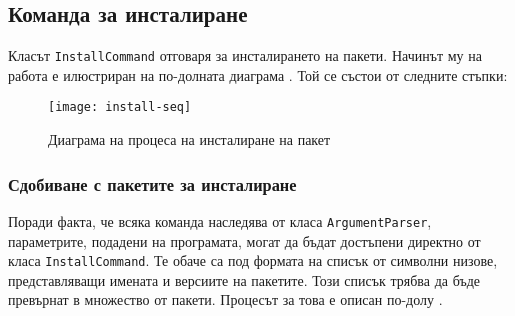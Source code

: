 \subsection{Команда за инсталиране}

Класът \texttt{InstallCommand} отговаря за инсталирането на пакети. Начинът му
на работа е илюстриран на по-долната диаграма . Той се
състои от следните стъпки:

\begin{figure}[H]
    \centering
    \texttt{[image: install-seq]}
    \caption{Диаграма на процеса на инсталиране на пакет}
	\label{fig:install-seq}
\end{figure}


\subsubsection{Сдобиване с пакетите за инсталиране}

Поради факта, че всяка команда наследява от класа \texttt{ArgumentParser},
параметрите, подадени на програмата, могат да бъдат достъпени директно от класа
\texttt{InstallCommand}. Те обаче са под формата на списък от символни низове,
представляващи имената и версиите на пакетите. Този списък трябва да бъде
превърнат в множество от пакети. Процесът за това е описан по-долу
.

